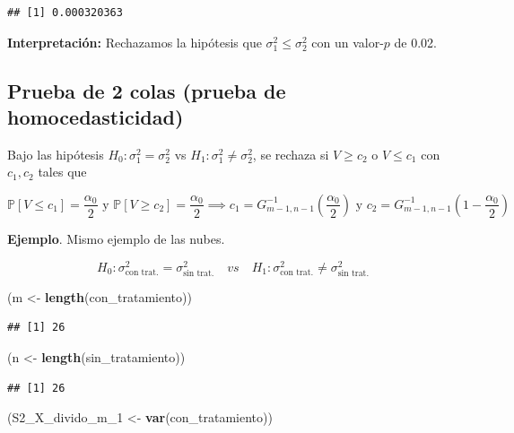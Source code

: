 \documentclass[
  12pt,
]{book}
\newenvironment{Shaded}{\begin{snugshade}}{\end{snugshade}}
\newcommand{\DecValTok}[1]{\textcolor[rgb]{0.00,0.00,0.81}{#1}}
\newcommand{\KeywordTok}[1]{\textcolor[rgb]{0.13,0.29,0.53}{\textbf{#1}}}
\newcommand{\NormalTok}[1]{#1}
\newcommand{\StringTok}[1]{\textcolor[rgb]{0.31,0.60,0.02}{#1}}
\begin{document}
\begin{verbatim}
## [1] 0.000320363
\end{verbatim}

\textbf{Interpretación:} Rechazamos la hipótesis que \(\sigma_{1}^{2} \leq \sigma_{2}^{2}\) con un valor-\(p\) de 0.02.

\hypertarget{prueba-de-2-colas-prueba-de-homocedasticidad}{%
\subsection{Prueba de 2 colas (prueba de homocedasticidad)}\label{prueba-de-2-colas-prueba-de-homocedasticidad}}

Bajo las hipótesis \(H_0: \sigma^2_1=\sigma^2_2\) vs
\(H_1: \sigma^2_1\ne\sigma^2_2\), se rechaza si \(V\geq c_2\) o \(V\leq c_1\) con
\(c_1,c_2\) tales que

\[\mathbb P[V\leq c_1] = \dfrac{\alpha_0}{2} \text{ y } \mathbb P[V\geq c_2] =
\dfrac{\alpha_0}{2} \implies c_1 =
G_{m-1,n-1}^{-1}\left(\dfrac{\alpha_0}{2}\right) \text{ y } c_2 =
G_{m-1,n-1}^{-1}\left(1-\dfrac{\alpha_0}{2}\right)\]

\textbf{Ejemplo}. Mismo ejemplo de las nubes.

\[
H_0: \sigma^{2}_{\text{con trat.}} = \sigma^{2}_{\text{sin trat.}} \quad
vs \quad
H_1: \sigma^{2}_{\text{con trat.}} \neq \sigma^{2}_{\text{sin trat.}} 
\]

\begin{Shaded}
\begin{Highlighting}[]
\NormalTok{(m \textless{}{-}}\StringTok{ }\KeywordTok{length}\NormalTok{(con\_tratamiento))}
\end{Highlighting}
\end{Shaded}

\begin{verbatim}
## [1] 26
\end{verbatim}

\begin{Shaded}
\begin{Highlighting}[]
\NormalTok{(n \textless{}{-}}\StringTok{ }\KeywordTok{length}\NormalTok{(sin\_tratamiento))}
\end{Highlighting}
\end{Shaded}

\begin{verbatim}
## [1] 26
\end{verbatim}

\begin{Shaded}
\begin{Highlighting}[]
\NormalTok{(S2\_X\_divido\_m\_}\DecValTok{1}\NormalTok{ \textless{}{-}}\StringTok{ }\KeywordTok{var}\NormalTok{(con\_tratamiento))}
\end{Highlighting}
\end{Shaded}
\end{document}
